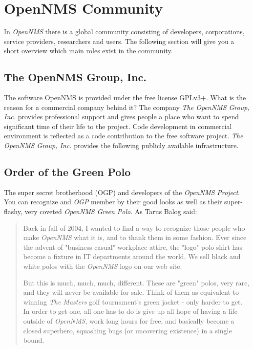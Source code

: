 \section{OpenNMS Community}
In \emph{OpenNMS} there is a global community consisting of developers, corporations, service providers, researchers and users. The following section will give you a short overview which main roles exist in the community.

\subsection*{The OpenNMS Group, Inc.}
The software OpenNMS is provided under the free license GPLv3+. What is the reason for a commercial company behind it? The company \emph{The OpenNMS Group, Inc.} provides professional support and gives people a place who want to spend significant time of their life to the project. Code development in commercial environment is reflected as a code contribution to the free software project. \emph{The OpenNMS Group, Inc.} provides the following publicly available infrastructure.\pageref{!!!!!REFERENCE!!!!}


\subsection*{Order of the Green Polo}
The super secret brotherhood (OGP) and developers of the \emph{OpenNMS Project}. You can recognize and \emph{OGP} member by their good looks as well as their super-flashy, very coveted \emph{OpenNMS Green Polo}. As Tarus Balog said:
 
\begin{quote}
Back in fall of 2004, I wanted to find a way to recognize those people who make \emph{OpenNMS} what it is, and to thank them in some fashion. 
Ever since the advent of "business casual" workplace attire, the "logo" polo shirt has become a fixture in IT departments around the world. We sell black and white polos with the \emph{OpenNMS} logo on our web site.

But this is much, much, much, different. These are "green" polos, very rare, and they will never be available for sale. Think of them as equivalent to winning \emph{The Masters} golf tournament's green jacket - only harder to get.
In order to get one, all one has to do is give up all hope of having a life outside of \emph{OpenNMS}, work long hours for free, and basically become a closed superhero, squashing bugs (or uncovering existence) in a single bound.
\end{quote}

